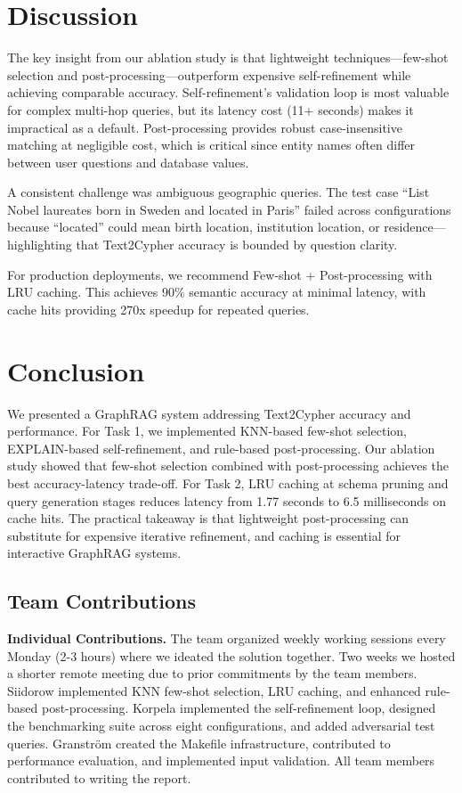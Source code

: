 \documentclass[sigconf]{acmart}
\begin{document}
\section{Discussion}
\label{sec:discussion}

The key insight from our ablation study is that lightweight techniques---few-shot selection and post-processing---outperform expensive self-refinement while achieving comparable accuracy. Self-refinement's validation loop is most valuable for complex multi-hop queries, but its latency cost (11+ seconds) makes it impractical as a default. Post-processing provides robust case-insensitive matching at negligible cost, which is critical since entity names often differ between user questions and database values.

A consistent challenge was ambiguous geographic queries. The test case ``List Nobel laureates born in Sweden and located in Paris'' failed across configurations because ``located'' could mean birth location, institution location, or residence---highlighting that Text2Cypher accuracy is bounded by question clarity.

For production deployments, we recommend Few-shot + Post-processing with LRU caching. This achieves 90\% semantic accuracy at minimal latency, with cache hits providing 270x speedup for repeated queries.

\section{Conclusion}
\label{sec:conclusion}

We presented a GraphRAG system addressing Text2Cypher accuracy and performance. For Task 1, we implemented KNN-based few-shot selection, EXPLAIN-based self-refinement, and rule-based post-processing. Our ablation study showed that few-shot selection combined with post-processing achieves the best accuracy-latency trade-off. For Task 2, LRU caching at schema pruning and query generation stages reduces latency from 1.77 seconds to 6.5 milliseconds on cache hits. The practical takeaway is that lightweight post-processing can substitute for expensive iterative refinement, and caching is essential for interactive GraphRAG systems.

\subsection*{Team Contributions}

\textbf{Individual Contributions.} The team organized weekly working sessions every Monday (2-3 hours) where we ideated the solution together. Two weeks we hosted a shorter remote meeting due to prior commitments by the team members. Siidorow implemented KNN few-shot selection, LRU caching, and enhanced rule-based post-processing. Korpela implemented the self-refinement loop, designed the benchmarking suite across eight configurations, and added adversarial test queries. Granström created the Makefile infrastructure, contributed to performance evaluation, and implemented input validation. All team members contributed to writing the report.
\end{document}
